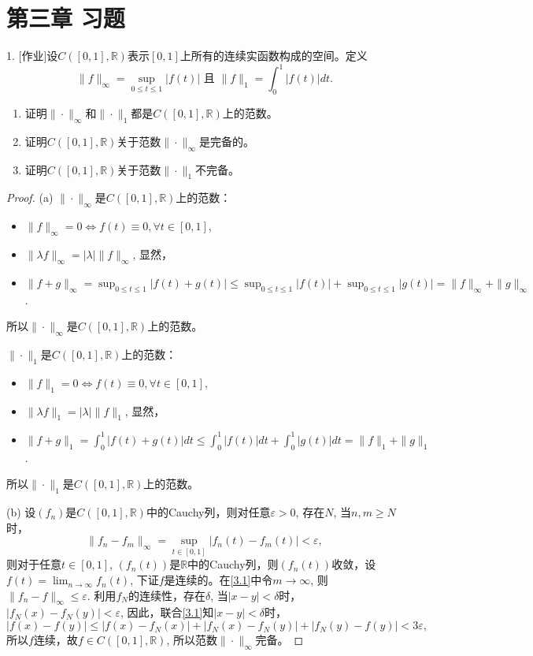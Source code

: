\documentclass[a4paper,8pt]{ctexart}\textwidth 140mm \textheight 216mm
\newcommand{\e}{\varepsilon}
\newcommand{\8}{\infty}
\begin{document}
\section{第三章 习题}
1. [作业]设$C([0,1],\mathbb{R})$表示$[0,1]$上所有的连续实函数构成的空间。定义
$$\|f\|_\infty=\sup_{0\leq t\leq 1}|f(t)|\mbox{ 且 }\|f\|_1=\int_0^1|f(t)|dt.$$
\begin{enumerate}
	\item[(a)] 证明$\|\cdot\|_\infty$和$\|\cdot\|_1$都是$C([0,1],\mathbb{R})$上的范数。
	\item[(b)] 证明$C([0,1],\mathbb{R})$关于范数$\|\cdot\|_\infty$是完备的。
	\item[(c)] 证明$C([0,1],\mathbb{R})$关于范数$\|\cdot\|_1$不完备。
\end{enumerate}
\begin{proof}
	(a) $\|\cdot\|_\infty$是$C([0,1],\mathbb{R})$上的范数：
	\begin{itemize}
		\item $\|f\|_\infty=0\Leftrightarrow f(t)\equiv 0,\forall t\in[0,1]$,
		\item $\|\lambda f\|_\infty=|\lambda|\|f\|_\infty$, 显然，
		\item $\|f+g\|_\infty=\sup_{0\leq t\leq 1}|f(t)+g(t)|\leq \sup_{0\leq t\leq 1}|f(t)|+\sup_{0\leq t\leq 1}|g(t)|=\|f\|_\infty+\|g\|_\infty$.
	\end{itemize}
    所以$\|\cdot\|_\infty$是$C([0,1],\mathbb{R})$上的范数。
    
    $\|\cdot\|_1$是$C([0,1],\mathbb{R})$上的范数：
    \begin{itemize}
    	\item $\|f\|_1=0\Leftrightarrow f(t)\equiv 0,\forall t\in[0,1]$,
    	\item $\|\lambda f\|_1=|\lambda|\|f\|_1$, 显然，
    	\item $\|f+g\|_1=\int_0^1 |f(t)+g(t)|dt\leq\int_0^1|f(t)|dt+\int_0^1|g(t)|dt =\|f\|_1+\|g\|_1$.
    \end{itemize}
    所以$\|\cdot\|_1$是$C([0,1],\mathbb{R})$上的范数。
    
    (b) 设$(f_n)$是$C([0,1],\mathbb{R})$中的Cauchy列，则对任意$\e>0$, 存在$N$, 当$n,m\geq N$时，
    \begin{equation}\label{3.1}
    	\|f_n-f_m\|_\infty=\sup_{t\in[0,1]}|f_n(t)-f_m(t)|<\e,\tag{*}
    \end{equation}
    则对于任意$t\in[0,1]$, $(f_n(t))$是$\mathbb{R}$中的Cauchy列，则$(f_n(t))$收敛，设$f(t)=\lim_{n\to\infty}f_n(t)$, 下证$f$是连续的。在\eqref{3.1}中令$m\to\infty$, 则$\|f_n-f\|_\infty\leq \e$. 利用$f_N$的连续性，存在$\delta$, 当$|x-y|<\delta$时，$|f_N(x)-f_N(y)|<\e$, 因此，联合\eqref{3.1}知$|x-y|<\delta$时，
    $$|f(x)-f(y)|\leq |f(x)-f_N(x)|+|f_N(x)-f_N(y)|+|f_N(y)-f(y)|<3\e,$$
    所以$f$连续，故$f\in C([0,1],\mathbb{R})$, 所以范数$\|\cdot\|_\infty$完备。
    

\end{proof}
\end{document}
